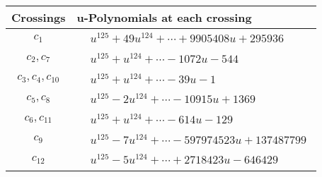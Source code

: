 \documentclass[1p]{elsarticle_modified}
\theoremstyle{definition}
\begin{document}
\begin{tabular}{m{50pt}|m{274pt}}
Crossings & \hspace{64pt}u-Polynomials at each crossing \\
\hline $$\begin{aligned}c_{1}\end{aligned}$$&$\begin{aligned}
&u^{125}+49 u^{124}+\cdots+9905408 u+295936
\end{aligned}$\\
\hline $$\begin{aligned}c_{2},c_{7}\end{aligned}$$&$\begin{aligned}
&u^{125}+u^{124}+\cdots-1072 u-544
\end{aligned}$\\
\hline $$\begin{aligned}c_{3},c_{4},c_{10}\end{aligned}$$&$\begin{aligned}
&u^{125}+u^{124}+\cdots-39 u-1
\end{aligned}$\\
\hline $$\begin{aligned}c_{5},c_{8}\end{aligned}$$&$\begin{aligned}
&u^{125}-2 u^{124}+\cdots-10915 u+1369
\end{aligned}$\\
\hline $$\begin{aligned}c_{6},c_{11}\end{aligned}$$&$\begin{aligned}
&u^{125}+u^{124}+\cdots-614 u-129
\end{aligned}$\\
\hline $$\begin{aligned}c_{9}\end{aligned}$$&$\begin{aligned}
&u^{125}-7 u^{124}+\cdots-597974523 u+137487799
\end{aligned}$\\
\hline $$\begin{aligned}c_{12}\end{aligned}$$&$\begin{aligned}
&u^{125}-5 u^{124}+\cdots+2718423 u-646429
\end{aligned}$\\
\hline
\end{tabular}\\~\\
\end{document}
